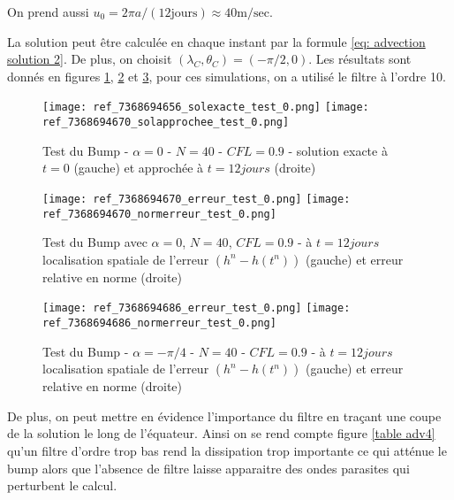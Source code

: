 On prend aussi $u_0 = 2  \pi a / (12 \text{jours} )\approx 40 \text{m/sec}$.

La solution peut être calculée en chaque instant par la formule \eqref{eq: advection solution 2}. De plus, on choisit $(\lambda_C, \theta_C) = ( - \pi/2, 0)$. Les résultats sont donnés en figures \ref{table adv1}, \ref{table adv2} et \ref{table adv3}, pour ces simulations, on a utilisé le filtre à l'ordre 10.


\begin{figure}[ht]
\begin{center}
\texttt{[image: ref\_7368694656\_solexacte\_test\_0.png]}
\texttt{[image: ref\_7368694670\_solapprochee\_test\_0.png]}
\caption{Test du Bump - $\alpha = 0$ - $N=40$ - $CFL=0.9$ - solution exacte à $t=0$ (gauche) et approchée à $t=12 jours$ (droite) }
\label{table adv1}
\end{center}
\end{figure}



\begin{figure}[ht]
\begin{center}
\texttt{[image: ref\_7368694670\_erreur\_test\_0.png]}
\texttt{[image: ref\_7368694670\_normerreur\_test\_0.png]}
\caption{Test du Bump avec $\alpha = 0$, $N=40$, $CFL=0.9$ - à $t=12 jours$ localisation spatiale de l'erreur $( h^n - h(t^n) )$ (gauche) et erreur relative en norme (droite) }
\label{table adv2}
\end{center}
\end{figure}



\begin{figure}[ht]
\begin{center}
\texttt{[image: ref\_7368694686\_erreur\_test\_0.png]}
\texttt{[image: ref\_7368694686\_normerreur\_test\_0.png]}
\caption{Test du Bump - $\alpha = - \pi /4$ - $N=40$ - $CFL=0.9$ - à $t=12 jours$ localisation spatiale de l'erreur $( h^n - h(t^n))$ (gauche) et erreur relative en norme (droite) }
\label{table adv3}
\end{center}
\end{figure}


De plus, on peut mettre en évidence l'importance du filtre en traçant une coupe de la solution le long de l'équateur. Ainsi on se rend compte figure \ref{table adv4} qu'un filtre d'ordre trop bas rend la dissipation trop importante ce qui atténue le bump alors que l'absence de filtre laisse apparaitre des ondes parasites qui perturbent le calcul.


